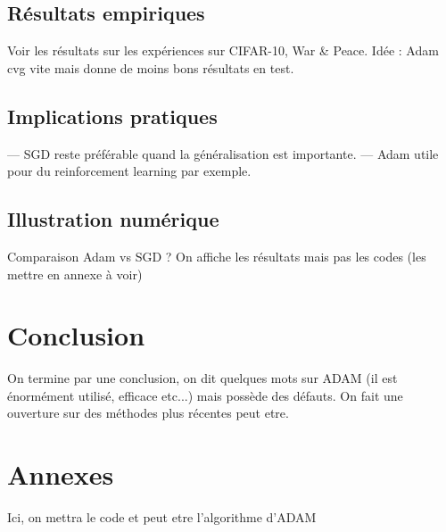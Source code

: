 \documentclass[a4paper,12pt]{article}
\begin{document}
\subsection{Résultats empiriques}

Voir les résultats sur les expériences sur CIFAR-10, War & Peace. Idée : Adam cvg vite mais
donne de moins bons résultats en test.

\subsection{Implications pratiques}

— SGD reste préférable quand la généralisation est importante.
— Adam utile pour du reinforcement learning par exemple.

\subsection{Illustration numérique}
Comparaison Adam vs SGD ? On affiche les résultats mais pas les codes (les mettre en annexe
à voir)

\section{Conclusion}

On termine par une conclusion, on dit quelques mots sur ADAM (il est énormément utilisé,
efficace etc...) mais possède des défauts. On fait une ouverture sur des méthodes plus récentes
peut etre.

\section*{Annexes}

Ici, on mettra le code et peut etre l’algorithme d’ADAM
\end{document}
